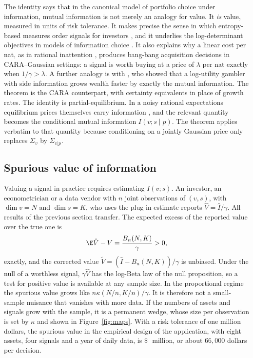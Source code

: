 The identity says that in the canonical model of portfolio choice under information, mutual information is not merely an analogy for value. It \emph{is} value, measured in units of risk tolerance. It makes precise the sense in which entropy-based measures order signals for investors \citep{cabrales2013entropy}, and it underlies the log-determinant objectives in models of information choice \citep{vannieuwerburgh2010information,veldkamp2011information,kacperczyk2016rational}. It also explains why a linear cost per nat, as in rational inattention \citep{sims2003implications,mackowiak2023rational}, produces bang-bang acquisition decisions in CARA--Gaussian settings: a signal is worth buying at a price of $\lambda$ per nat exactly when $1/\gamma>\lambda$. A further analogy is with \citet{kelly1956new}, who showed that a log-utility gambler with side information grows wealth faster by exactly the mutual information. The theorem is the CARA counterpart, with certainty equivalents in place of growth rates. The identity is partial-equilibrium. In a noisy rational expectations equilibrium prices themselves carry information \citep{grossman1980impossibility,hellwig1980aggregation,verrecchia1982information}, and the relevant quantity becomes the conditional mutual information $I(v;s\mid p)$. The theorem applies verbatim to that quantity because conditioning on a jointly Gaussian price only replaces $\Sigma_v$ by $\Sigma_{v|p}$.

\subsection*{Spurious value of information}

Valuing a signal in practice requires estimating $I(v;s)$. An investor, an econometrician or a data vendor with $n$ joint observations of $(v,s)$, with $\dim v=N$ and $\dim s=K$, who uses the plug-in estimate reports $\hat V=\hat I/\gamma$. All results of the previous section transfer. The expected excess of the reported value over the true one is
\[
 \E\hat V-V=\frac{B_n(N,K)}\gamma>0,
\]
exactly, and the corrected value $\tilde V=(\hat I-B_n(N,K))/\gamma$ is unbiased. Under the null of a worthless signal, $\gamma\hat V$ has the log-Beta law of the null proposition, so a test for positive value is available at any sample size. In the proportional regime the spurious value grows like $n\kappa(N/n,K/n)/\gamma$. It is therefore not a small-sample nuisance that vanishes with more data. If the numbers of assets and signals grow with the sample, it is a permanent wedge, whose size per observation is set by $\kappa$ and shown in Figure~\ref{fig:maps}. With a risk tolerance of one million dollars, the spurious value in the empirical design of the application, with eight assets, four signals and a year of daily data, is $\$\,$\MIBias{}~million, or about $66{,}000$ dollars per decision.

